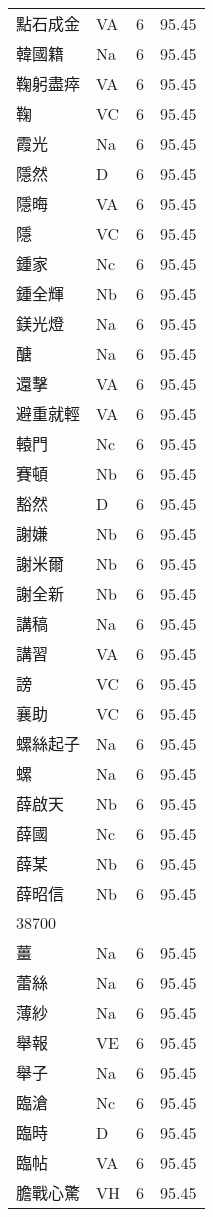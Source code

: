 \documentclass[twocolumn]{book}
\begin{document}
\begin{supertabular}{llrr}
點石成金 & VA & 6 &  95.45\\
韓國籍 & Na & 6 &  95.45\\
鞠躬盡瘁 & VA & 6 &  95.45\\
鞠 & VC & 6 &  95.45\\
霞光 & Na & 6 &  95.45\\
隱然 & D & 6 &  95.45\\
隱晦 & VA & 6 &  95.45\\
隱 & VC & 6 &  95.45\\
鍾家 & Nc & 6 &  95.45\\
鍾全輝 & Nb & 6 &  95.45\\
鎂光燈 & Na & 6 &  95.45\\
醣 & Na & 6 &  95.45\\
還擊 & VA & 6 &  95.45\\
避重就輕 & VA & 6 &  95.45\\
轅門 & Nc & 6 &  95.45\\
賽頓 & Nb & 6 &  95.45\\
豁然 & D & 6 &  95.45\\
謝嫌 & Nb & 6 &  95.45\\
謝米爾 & Nb & 6 &  95.45\\
謝全新 & Nb & 6 &  95.45\\
講稿 & Na & 6 &  95.45\\
講習 & VA & 6 &  95.45\\
謗 & VC & 6 &  95.45\\
襄助 & VC & 6 &  95.45\\
螺絲起子 & Na & 6 &  95.45\\
螺 & Na & 6 &  95.45\\
薛啟天 & Nb & 6 &  95.45\\
薛國 & Nc & 6 &  95.45\\
薛某 & Nb & 6 &  95.45\\
薛昭信 & Nb & 6 &  95.45\\
38700\\
薑 & Na & 6 &  95.45\\
蕾絲 & Na & 6 &  95.45\\
薄紗 & Na & 6 &  95.45\\
舉報 & VE & 6 &  95.45\\
舉子 & Na & 6 &  95.45\\
臨滄 & Nc & 6 &  95.45\\
臨時 & D & 6 &  95.45\\
臨帖 & VA & 6 &  95.45\\
膽戰心驚 & VH & 6 &  95.45\\

\end{supertabular}
\end{document}

